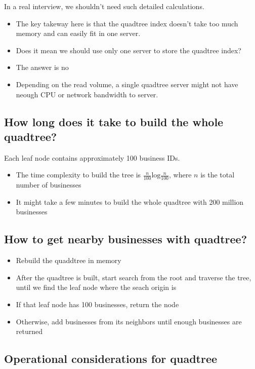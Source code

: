 \documentclass{report}
\theoremstyle{definition}
\let\oldsubsection\subsection
\renewcommand{\subsection}{\oldsubsection*}
\begin{document}
In a real interview, we shouldn't need such detailed calculations.

\begin{itemize}
\item
The key takeway here is that the quadtree index doesn't take too much memory and can easily fit in one server.
\item
Does it mean we should use only one server to store the quadtree index?
\item
The answer is no
\item
Depending on the read volume, a single quadtree server might not have neough CPU or network bandwidth to server.
\end{itemize}

\subsection{How long does it take to build the whole quadtree?}

Each leaf node contains approximately 100 business IDs.

\begin{itemize}
\item
The time complexity to build the tree is $\frac{n}{100} \text{log} \frac{n}{100}$, where $n$ is the total number of businesses
\item
It might take a few minutes to build the whole quadtree with 200 million businesses
\end{itemize}

\subsection{How to get nearby businesses with quadtree?}

\begin{itemize}
\item
Rebuild the quaddtree in memory
\item
After the quadtree is built, start search from the root and traverse the tree, until we find the leaf node where the seach origin is
\item
If that leaf node has 100 businesses, return the node
\item
Otherwise, add businesses from its neighbors until enough businesses are returned
\end{itemize}

\subsection{Operational considerations for quadtree}
\end{document}
